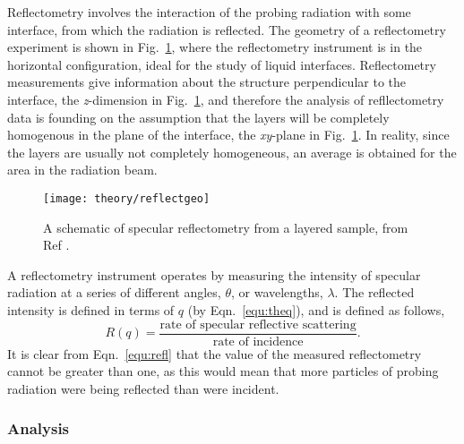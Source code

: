 Reflectometry involves the interaction of the probing radiation with some interface, from which the radiation is reflected.
The geometry of a reflectometry experiment is shown in Fig.~\ref{fig:refgeo}, where the reflectometry instrument is in the horizontal configuration, ideal for the study of liquid interfaces.
Reflectometry measurements give information about the structure perpendicular to the interface, the \emph{z}-dimension in Fig.~\ref{fig:refgeo}, and therefore the analysis of refllectometry data is founding on the assumption that the layers will be completely homogenous in the plane of the interface, the \emph{xy}-plane in Fig.~\ref{fig:refgeo}.
In reality, since the layers are usually not completely homogeneous, an average is obtained for the area in the radiation beam.
%
\begin{figure}
	\centering
	\texttt{[image: theory/reflectgeo]}
	\caption{A schematic of specular reflectometry from a layered sample, from Ref \cite{Sivia2011}.}
	\label{fig:refgeo}
\end{figure}
%
A reflectometry instrument operates by measuring the intensity of specular radiation at a series of different angles, $\theta$, or wavelengths, $\lambda$.
The reflected intensity is defined in terms of $q$ (by Eqn.~\ref{equ:theq}), and is defined as follows,
%
\begin{equation}
	R(q) = \frac{\text{rate of specular reflective scattering}}{\text{rate of incidence}}.
	\label{equ:refl}
\end{equation}
%
It is clear from Eqn.~\ref{equ:refl} that the value of the measured reflectometry cannot be greater than one, as this would mean that more particles of probing radiation were being reflected than were incident.

\subsubsection{Analysis}

